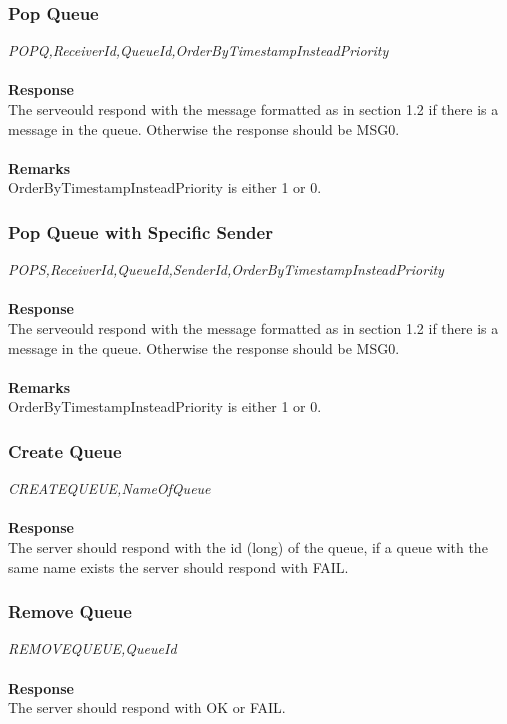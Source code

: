 \documentclass{article}
\begin{document}
            \subsubsection{Pop Queue}
                \indent\indent\textit{POPQ,ReceiverId,QueueId,OrderByTimestampInsteadPriority}\\
                \\
                \textbf{Response}\\
                The serveould respond with the message formatted as in section 1.2 if there is a message in the queue. Otherwise the response should be MSG0.\\
                \\
                \textbf{Remarks}\\
                OrderByTimestampInsteadPriority is either 1 or 0.

            \subsubsection{Pop Queue with Specific Sender}
                \indent\indent\textit{POPS,ReceiverId,QueueId,SenderId,OrderByTimestampInsteadPriority}\\
                \\
                \textbf{Response}\\
                The serveould respond with the message formatted as in section 1.2 if there is a message in the queue. Otherwise the response should be MSG0.\\
                \\
                \textbf{Remarks}\\
                OrderByTimestampInsteadPriority is either 1 or 0.

            \subsubsection{Create Queue}
                \indent\indent\textit{CREATEQUEUE,NameOfQueue}\\
                \\
                \textbf{Response}\\
                The server should respond with the id (long) of the queue, if a queue with the same name exists the server should respond with FAIL.

            \subsubsection{Remove Queue}
                \indent\indent\textit{REMOVEQUEUE,QueueId}\\
                \\
                \textbf{Response}\\
                The server should respond with OK or FAIL.
\end{document}
